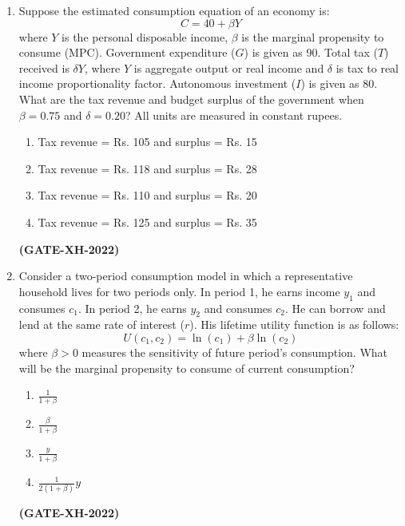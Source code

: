 \documentclass[journal]{IEEEtran}
\begin{document}
\begin{enumerate}
\item Suppose the estimated consumption equation of an economy is:
\[
C = 40 + \beta Y
\]
where $Y$ is the personal disposable income, $\beta$ is the marginal propensity to consume (MPC). Government expenditure ($G$) is given as 90. Total tax ($T$) received is $\delta Y$, where $Y$ is aggregate output or real income and $\delta$ is tax to real income proportionality factor. Autonomous investment ($I$) is given as 80. What are the tax revenue and budget surplus of the government when $\beta = 0.75$ and $\delta = 0.20$? All units are measured in constant rupees.
\begin{enumerate}
\item Tax revenue = Rs. 105 and surplus = Rs. 15
\item Tax revenue = Rs. 118 and surplus = Rs. 28
\item Tax revenue = Rs. 110 and surplus = Rs. 20
\item Tax revenue = Rs. 125 and surplus = Rs. 35
\end{enumerate}
\hfill\textbf{(GATE-XH-2022)}

\item Consider a two-period consumption model in which a representative household lives for two periods only. In period 1, he earns income $y_1$ and consumes $c_1$. In period 2, he earns $y_2$ and consumes $c_2$. He can borrow and lend at the same rate of interest ($r$). His lifetime utility function is as follows:
\[
U(c_1, c_2) = \ln(c_1) + \beta \ln(c_2)
\]
where $\beta > 0$ measures the sensitivity of future period’s consumption. What will be the marginal propensity to consume of current consumption?
\begin{multicols}{4}
\begin{enumerate}
\item $\frac{1}{1+\beta}$
\item $\frac{\beta}{1+\beta}$
\item $\frac{y}{1+\beta}$
\item $\frac{1}{2(1+\beta)} y$
\end{enumerate}
\end{multicols}
\hfill\textbf{(GATE-XH-2022)}


\end{enumerate}
\end{document}
